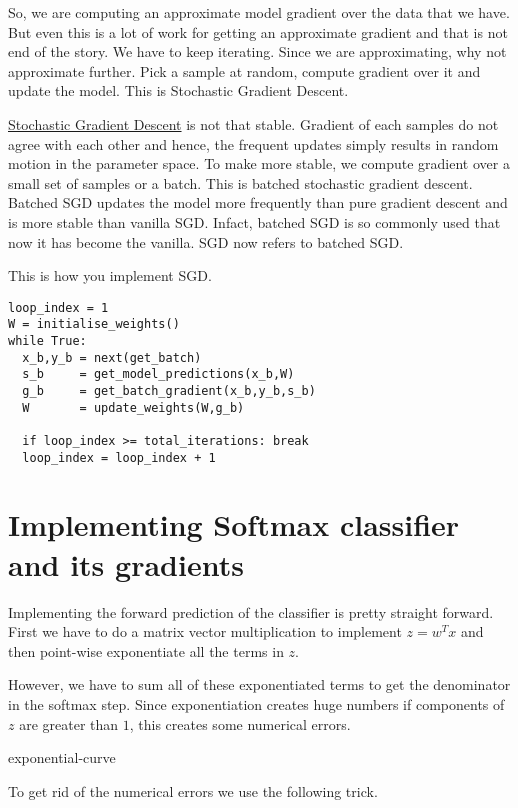 \documentclass[10pt]{article}
\begin{document}
So, we are computing an approximate model gradient over the data that we have. But even this is a lot of work for getting an approximate gradient and that is not end of the story. We have to keep iterating. Since we are approximating, why not approximate further. Pick a sample at random, compute gradient over it and update the model. This is Stochastic Gradient Descent.

\href{https://en.wikipedia.org/wiki/Stochastic_gradient_descent}{Stochastic Gradient Descent} is not that stable. Gradient of each samples do not agree with each other and hence, the frequent updates simply results in random motion in the parameter space. To make more stable, we compute gradient over a small set of samples or a batch. This is batched stochastic gradient descent. Batched SGD updates the model more frequently than pure gradient descent and is more stable than vanilla SGD. Infact, batched SGD is so commonly used that now it has become the vanilla. SGD now refers to batched SGD.

This is how you implement SGD.
\begin{verbatim}
loop_index = 1
W = initialise_weights()
while True:
  x_b,y_b = next(get_batch)
  s_b     = get_model_predictions(x_b,W)
  g_b     = get_batch_gradient(x_b,y_b,s_b)
  W       = update_weights(W,g_b)

  if loop_index >= total_iterations: break
  loop_index = loop_index + 1
\end{verbatim}

\section{Implementing Softmax classifier and its gradients}
Implementing the forward prediction of the classifier is pretty straight forward. First we have to do a matrix vector multiplication to implement $z=w^Tx$ and then point-wise exponentiate all the terms in $z$.

However, we have to sum all of these exponentiated terms to get the denominator in the softmax step. Since exponentiation creates huge numbers if components of $z$ are greater than $1$, this creates some numerical errors. 

\begin{center}
  {exponential-curve} %
\end{center}

To get rid of the numerical errors we use the following trick.
\end{document}
